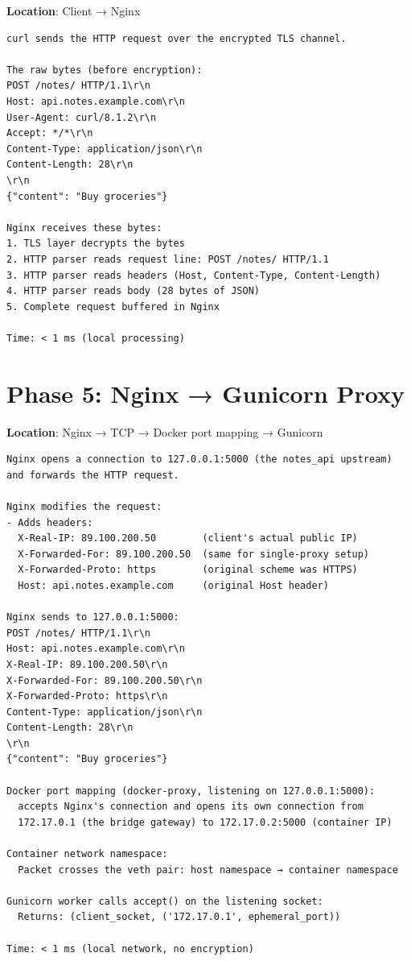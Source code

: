 \textbf{Location}: Client → Nginx

\begin{outputbox}
\begin{Verbatim}[fontsize=\codesize, breaklines, breakanywhere, breaksymbolleft={\tiny\textcolor{muted}{$\hookrightarrow$}}]
curl sends the HTTP request over the encrypted TLS channel.

The raw bytes (before encryption):
POST /notes/ HTTP/1.1\r\n
Host: api.notes.example.com\r\n
User-Agent: curl/8.1.2\r\n
Accept: */*\r\n
Content-Type: application/json\r\n
Content-Length: 28\r\n
\r\n
{"content": "Buy groceries"}

Nginx receives these bytes:
1. TLS layer decrypts the bytes
2. HTTP parser reads request line: POST /notes/ HTTP/1.1
3. HTTP parser reads headers (Host, Content-Type, Content-Length)
4. HTTP parser reads body (28 bytes of JSON)
5. Complete request buffered in Nginx

Time: < 1 ms (local processing)
\end{Verbatim}
\end{outputbox}

\setcounter{section}{5}
\section{Phase 5: Nginx → Gunicorn Proxy}\label{29-client-server-journey:296-phase-5-nginx--gunicorn-proxy}

\textbf{Location}: Nginx → TCP → Docker port mapping → Gunicorn

\begin{outputbox}
\begin{Verbatim}[fontsize=\codesize, breaklines, breakanywhere, breaksymbolleft={\tiny\textcolor{muted}{$\hookrightarrow$}}]
Nginx opens a connection to 127.0.0.1:5000 (the notes_api upstream)
and forwards the HTTP request.

Nginx modifies the request:
- Adds headers:
  X-Real-IP: 89.100.200.50        (client's actual public IP)
  X-Forwarded-For: 89.100.200.50  (same for single-proxy setup)
  X-Forwarded-Proto: https        (original scheme was HTTPS)
  Host: api.notes.example.com     (original Host header)

Nginx sends to 127.0.0.1:5000:
POST /notes/ HTTP/1.1\r\n
Host: api.notes.example.com\r\n
X-Real-IP: 89.100.200.50\r\n
X-Forwarded-For: 89.100.200.50\r\n
X-Forwarded-Proto: https\r\n
Content-Type: application/json\r\n
Content-Length: 28\r\n
\r\n
{"content": "Buy groceries"}

Docker port mapping (docker-proxy, listening on 127.0.0.1:5000):
  accepts Nginx's connection and opens its own connection from
  172.17.0.1 (the bridge gateway) to 172.17.0.2:5000 (container IP)

Container network namespace:
  Packet crosses the veth pair: host namespace → container namespace

Gunicorn worker calls accept() on the listening socket:
  Returns: (client_socket, ('172.17.0.1', ephemeral_port))

Time: < 1 ms (local network, no encryption)
\end{Verbatim}
\end{outputbox}

